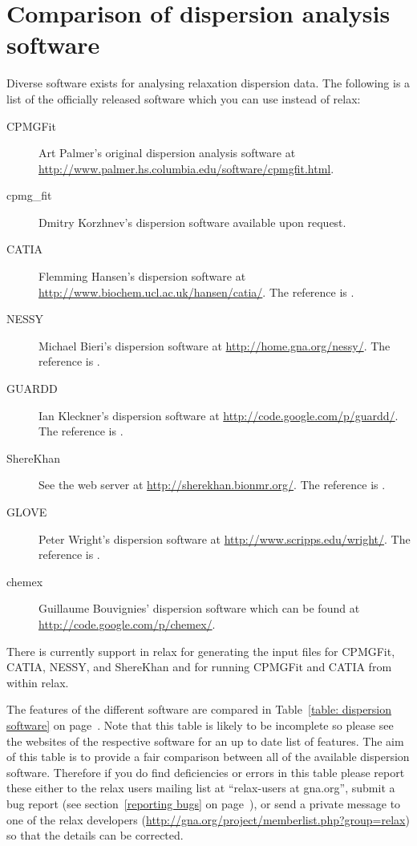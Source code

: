 
\section{Comparison of dispersion analysis software}
\label{sect: dispersion: software comparison}

Diverse software exists for analysing relaxation dispersion data.
The following is a list of the officially released software which you can use instead of relax:

\begin{description}
\item[CPMGFit] Art Palmer's original dispersion analysis software at \url{http://www.palmer.hs.columbia.edu/software/cpmgfit.html}.
\item[cpmg\_fit] Dmitry Korzhnev's dispersion software available upon request.
\item[CATIA] Flemming Hansen's dispersion software at \url{http://www.biochem.ucl.ac.uk/hansen/catia/}.  The reference is \citet{Hansen08}.
\item[NESSY] Michael Bieri's dispersion software at \url{http://home.gna.org/nessy/}.  The reference is \citet{BieriGooley11}.
\item[GUARDD] Ian Kleckner's dispersion software at \url{http://code.google.com/p/guardd/}.  The reference is \citet{KlecknerFoster12}.
\item[ShereKhan] See the web server at \url{http://sherekhan.bionmr.org/}.  The reference is \citet{Mazur13}.
\item[GLOVE] Peter Wright's dispersion software at \url{http://www.scripps.edu/wright/}.  The reference is \citet{Sugase13}.
\item[chemex] Guillaume Bouvignies' dispersion software which can be found at \url{http://code.google.com/p/chemex/}.
\end{description}

There is currently support in relax for generating the input files for CPMGFit, CATIA, NESSY, and ShereKhan and for running CPMGFit and CATIA from within relax.

The features of the different software are compared in Table~\ref{table: dispersion software} on page~\pageref{table: dispersion software}.
Note that this table is likely to be incomplete so please see the websites of the respective software for an up to date list of features.
The aim of this table is to provide a fair comparison between all of the available dispersion software.
Therefore if you do find deficiencies or errors in this table please report these either to the relax users mailing list at ``relax-users at gna.org'', submit a bug report (see section~\ref{reporting bugs} on page~\pageref{reporting bugs}), or send a private message to one of the relax developers (\url{http://gna.org/project/memberlist.php?group=relax}) so that the details can be corrected.

